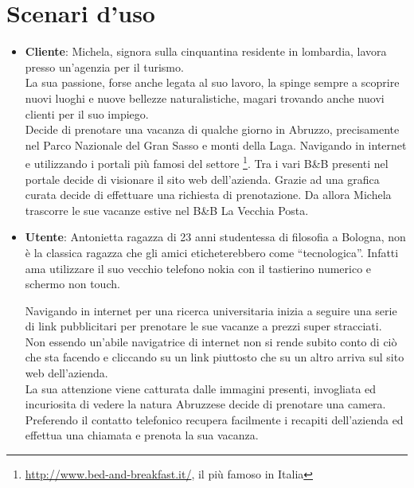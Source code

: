 \documentclass[a4paper,12pt,hidelinks]{report}
\begin{document}
\section{Scenari d'uso}
  \par
  \begin{itemize}
  \item \textbf{Cliente}: Michela, signora sulla cinquantina residente in lombardia, lavora presso un'agenzia per il turismo.
  \\La sua passione, forse anche legata al suo lavoro, la spinge sempre a scoprire nuovi luoghi e nuove bellezze naturalistiche, magari trovando anche 
  nuovi clienti per il suo impiego.
  \\ Decide di prenotare una vacanza di qualche giorno in Abruzzo, precisamente nel Parco Nazionale del Gran Sasso e monti della Laga. 
  Navigando in internet e utilizzando i portali più famosi del settore \footnote{\url{http://www.bed-and-breakfast.it/}, il più famoso in Italia}.
  Tra i vari B\&B presenti nel portale decide di visionare il sito web dell'azienda.
  Grazie ad una grafica curata decide di effettuare una richiesta di prenotazione. Da allora Michela trascorre le sue vacanze estive nel 
  B\&B La Vecchia Posta.
  
  \item \textbf{Utente}: Antonietta ragazza di 23 anni studentessa di filosofia a Bologna, non è la classica ragazza che gli amici eticheterebbero come ``tecnologica''. 
  Infatti ama utilizzare il suo vecchio telefono nokia con il tastierino numerico e schermo non touch. 
  \par Navigando in internet per una ricerca universitaria inizia a seguire una serie di link pubblicitari per prenotare le sue vacanze a prezzi super stracciati. 
  \\ Non essendo un'abile navigatrice di internet non si rende subito conto di ciò che sta facendo e cliccando su un link piuttosto che su un altro
  arriva sul sito web dell'azienda.
  \\La sua attenzione viene catturata dalle immagini presenti, invogliata ed incuriosita di vedere la natura Abruzzese decide di prenotare una camera.
  Preferendo il contatto telefonico recupera facilmente i recapiti dell'azienda ed effettua una chiamata e prenota la sua vacanza.
  \end{itemize}
\end{document}
